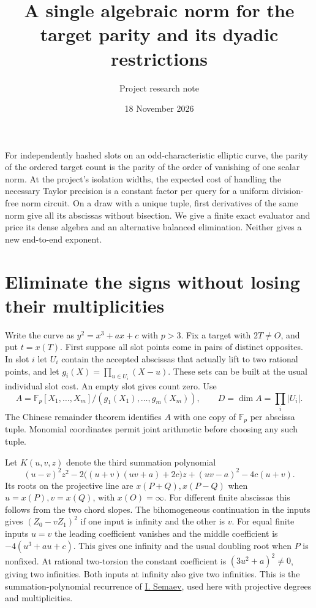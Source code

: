 \documentclass[11pt]{article}
\title{A single algebraic norm for the target parity and its dyadic restrictions}
\author{Project research note}
\date{18 November 2026}
\newcommand{\F}{\mathbb F}
\begin{document}
\maketitle

For independently hashed slots on an odd-characteristic elliptic curve,
the parity of the ordered target count is the parity of the order of
vanishing of one scalar norm. At the project's isolation widths,
the expected cost of handling the necessary Taylor precision is a
constant factor per query for a uniform division-free norm circuit.
On a draw with a unique tuple, first derivatives of the same norm
give all its abscissas without bisection. We give a finite exact
evaluator and price its dense algebra and an alternative balanced
elimination. Neither gives a new end-to-end exponent.

\section{Eliminate the signs without losing their multiplicities}
Write the curve as $y^2=x^3+ax+c$ with $p>3$. Fix a target with
$2T\ne O$, and put $t=x(T)$. First suppose all slot points come
in pairs of distinct opposites. In slot $i$ let $U_i$ contain the
accepted abscissas that actually lift to two rational points, and let
$g_i(X)=\prod_{u\in U_i}(X-u)$. These sets can be built at the
usual individual slot cost. An empty slot gives count zero. Use
\[
  A=\F_p[X_1,\ldots,X_m]/(g_1(X_1),\ldots,g_m(X_m)),\qquad
  D=\dim A=\prod_i |U_i|.
\]
The Chinese remainder theorem identifies $A$ with one copy of $\F_p$
per abscissa tuple. Monomial coordinates permit joint arithmetic before
choosing any such tuple.

Let $K(u,v,z)$ denote the third summation polynomial
\[
 (u-v)^2z^2-2\big((u+v)(uv+a)+2c\big)z
             +(uv-a)^2-4c(u+v).
\]
Its roots on the projective line are $x(P+Q),x(P-Q)$ when
$u=x(P),v=x(Q)$, with $x(O)=\infty$. For different finite
abscissas this follows from the two chord slopes. The bihomogeneous
continuation in the inputs gives $(Z_0-vZ_1)^2$ if one input is
infinity and the other is $v$. For equal finite inputs $u=v$ the
leading coefficient vanishes and the middle coefficient is
$-4(u^3+au+c)$. This gives one infinity and the usual doubling
root when $P$ is nonfixed. At rational two-torsion the constant
coefficient is $(3u^2+a)^2\ne0$, giving two infinities.
Both inputs at infinity also give two infinities. This is the
summation-polynomial recurrence of
\href{https://eprint.iacr.org/2004/031}{I. Semaev}, used here with
projective degrees and multiplicities.
\end{document}
